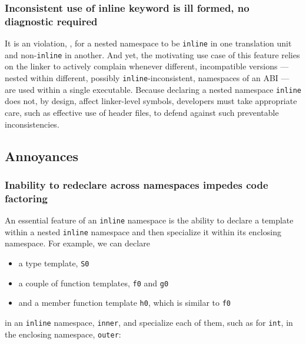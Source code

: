 \subsubsection[Inconsistent use of \lstinline!inline! keyword is ill formed, no diagnostic required]{Inconsistent use of {\SubsubsecCode inline} keyword is ill formed, no diagnostic required}\label{inconsistent-use-of-inline-keyword-is-ifndr}

It is an  violation, , for a nested namespace
to be \lstinline!inline! in one translation unit and non-\lstinline!inline! in
another. And yet, the motivating use case of this feature relies on the
linker to actively complain whenever different, incompatible versions
--- nested within different, possibly \lstinline!inline!-inconsistent,
namespaces of an ABI --- are used within a single executable. Because
declaring a nested namespace \lstinline!inline! does not, by design, affect
linker-level symbols, developers must take appropriate care, such as
effective use of header files, to defend against such preventable
inconsistencies.

\subsection[Annoyances]{Annoyances}\label{annoyances-inlinenamespace}

\subsubsection[Inability to redeclare across namespaces impedes code factoring]{Inability to redeclare across namespaces impedes code factoring}\label{inability-to-redeclare-across-namespaces-impedes-code-factoring}

An essential feature of an \lstinline!inline! namespace is the ability to
declare a template within a nested \lstinline!inline! namespace and then
specialize it within its enclosing namespace. For example, we can
declare
\begin{itemize}
\item{a type template, \lstinline!S0!}
\item{a couple of function templates, \lstinline!f0! and \lstinline!g0!}
\item{and a member function template \lstinline!h0!, which is similar to \lstinline!f0!}
\end{itemize}
in an \lstinline!inline! namespace, \lstinline!inner!, and specialize each of
them, such as for \lstinline!int!, in the enclosing namespace,
\lstinline!outer!:

